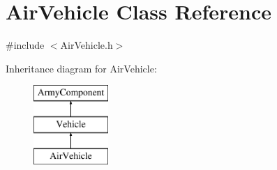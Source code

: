 \hypertarget{class_air_vehicle}{}\section{Air\+Vehicle Class Reference}
\label{class_air_vehicle}


{\ttfamily \#include $<$Air\+Vehicle.\+h$>$}

Inheritance diagram for Air\+Vehicle\+:\begin{figure}[H]
\begin{center}
\leavevmode
\includegraphics[height=3.000000cm]{class_air_vehicle}
\end{center}
\end{figure}
